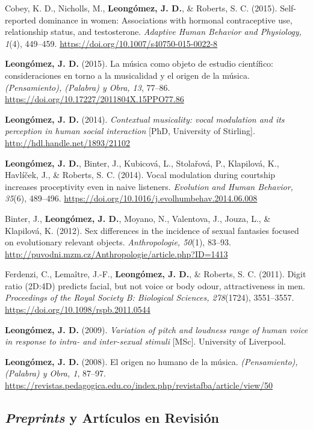 \documentclass[11pt,a4paper,]{awesome-cv}
\begin{document}
Cobey, K. D., Nicholls, M., \textbf{Leongómez, J. D.}, \& Roberts, S. C.
(2015). Self-reported dominance in women: Associations with hormonal
contraceptive use, relationship status, and testosterone. \emph{Adaptive
Human Behavior and Physiology, 1}(4), 449--459.
\url{https://doi.org/10.1007/s40750-015-0022-8}

\textbf{Leongómez, J. D.} (2015). La música como objeto de estudio
científico: consideraciones en torno a la musicalidad y el origen de la
música. \emph{(Pensamiento), (Palabra) y Obra, 13}, 77--86.
\url{https://doi.org/10.17227/2011804X.15PPO77.86}

\textbf{Leongómez, J. D.} (2014). \emph{Contextual musicality: vocal
modulation and its perception in human social interaction} {[}PhD,
University of Stirling{]}. \url{http://hdl.handle.net/1893/21102}

\textbf{Leongómez, J. D.}, Binter, J., Kubicová, L., Stolařová, P.,
Klapilová, K., Havlíček, J., \& Roberts, S. C. (2014). Vocal modulation
during courtship increases proceptivity even in naive listeners.
\emph{Evolution and Human Behavior, 35}(6), 489--496.
\url{https://doi.org/10.1016/j.evolhumbehav.2014.06.008}

Binter, J., \textbf{Leongómez, J. D.}, Moyano, N., Valentova, J., Jouza,
L., \& Klapilová, K. (2012). Sex differences in the incidence of sexual
fantasies focused on evolutionary relevant objects. \emph{Anthropologie,
50}(1), 83--93.
\url{http://puvodni.mzm.cz/Anthropologie/article.php?ID=1413}

Ferdenzi, C., Lemaître, J.-F., \textbf{Leongómez, J. D.}, \& Roberts, S.
C. (2011). Digit ratio (2D:4D) predicts facial, but not voice or body
odour, attractiveness in men. \emph{Proceedings of the Royal Society B:
Biological Sciences, 278}(1724), 3551--3557.
\url{https://doi.org/10.1098/rspb.2011.0544}

\textbf{Leongómez, J. D.} (2009). \emph{Variation of pitch and loudness
range of human voice in response to intra- and inter-sexual stimuli}
{[}MSc{]}. University of Liverpool.

\textbf{Leongómez, J. D.} (2008). El origen no humano de la música.
\emph{(Pensamiento), (Palabra) y Obra, 1}, 87--97.
\url{https://revistas.pedagogica.edu.co/index.php/revistafba/article/view/50}

\endgroup

\subsection{\texorpdfstring{\textbf{\textit{Preprints} y Artículos en Revisión}}{}}\label{section-1}
\end{document}
